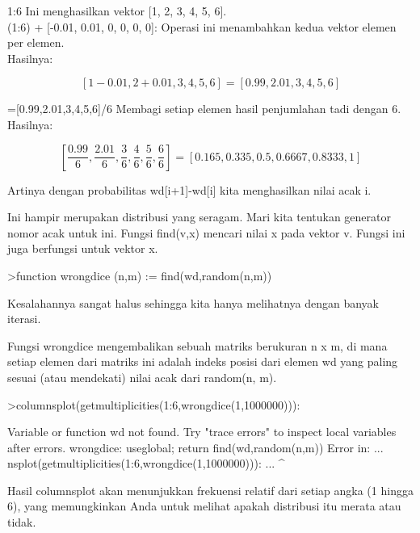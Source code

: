 \documentclass[a4paper,10pt]{article}
\begin{document}
\begin{eulernotebook}
\begin{eulercomment}
\begin{eulercomment}
\begin{eulercomment}
1:6 Ini menghasilkan vektor [1, 2, 3, 4, 5, 6].\\
(1:6) + [-0.01, 0.01, 0, 0, 0, 0]: Operasi ini menambahkan kedua
vektor elemen per elemen.\\
Hasilnya: \\
\end{eulercomment}
\begin{eulerformula}
\[
[1-0.01, 2+0.01, 3, 4, 5, 6] = [0.99, 2.01, 3, 4, 5, 6]
\]
\end{eulerformula}
\begin{eulercomment}
[1-0.01,2+0.01,3,4,5,6]=[0.99,2.01,3,4,5,6]/6 Membagi setiap elemen
hasil penjumlahan tadi dengan 6.\\
Hasilnya:\\
\end{eulercomment}
\begin{eulerformula}
\[
[\frac {0.99}{6}, \frac {2.01}{6}, \frac {3}{6}, \frac {4}{6}, \frac {5}{6}, \frac {6}{6}] = [0.165, 0.335, 0.5,0.6667, 0.8333, 1]
\]
\end{eulerformula}
\begin{eulercomment}
Artinya dengan probabilitas wd[i+1]-wd[i] kita menghasilkan nilai acak
i.

Ini hampir merupakan distribusi yang seragam. Mari kita tentukan
generator nomor acak untuk ini. Fungsi find(v,x) mencari nilai x pada
vektor v. Fungsi ini juga berfungsi untuk vektor x.
\end{eulercomment}
\begin{eulerprompt}
>function wrongdice (n,m) := find(wd,random(n,m))
\end{eulerprompt}
\begin{eulercomment}
Kesalahannya sangat halus sehingga kita hanya melihatnya dengan banyak
iterasi.

Fungsi wrongdice mengembalikan sebuah matriks berukuran n x m, di mana
setiap elemen dari matriks ini adalah indeks posisi dari elemen wd
yang paling sesuai (atau mendekati) nilai acak dari random(n, m).
\end{eulercomment}
\begin{eulerprompt}
>columnsplot(getmultiplicities(1:6,wrongdice(1,1000000))):
\end{eulerprompt}
\begin{euleroutput}
  Variable or function wd not found.
  Try "trace errors" to inspect local variables after errors.
  wrongdice:
      useglobal; return find(wd,random(n,m)) 
  Error in:
  ... nsplot(getmultiplicities(1:6,wrongdice(1,1000000))): ...
                                                       ^
\end{euleroutput}
\begin{eulercomment}
Hasil columnsplot akan menunjukkan frekuensi relatif dari setiap angka
(1 hingga 6), yang memungkinkan Anda untuk melihat apakah distribusi
itu merata atau tidak.


\end{eulercomment}
\end{eulercomment}
\end{eulercomment}
\end{eulernotebook}
\end{document}
